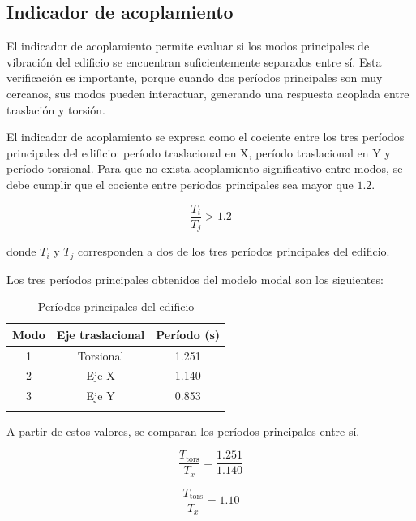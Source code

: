 \subsection{Indicador de acoplamiento}

El indicador de acoplamiento permite evaluar si los modos principales de vibración del edificio se encuentran suficientemente separados entre sí. Esta verificación es importante, porque cuando dos períodos principales son muy cercanos, sus modos pueden interactuar, generando una respuesta acoplada entre traslación y torsión.

El indicador de acoplamiento se expresa como el cociente entre los tres períodos principales del edificio: período traslacional en X, período traslacional en Y y período torsional. Para que no exista acoplamiento significativo entre modos, se debe cumplir que el cociente entre períodos principales sea mayor que $1.2$.

\begin{equation}
\frac{T_i}{T_j} > 1.2
\end{equation}

donde $T_i$ y $T_j$ corresponden a dos de los tres períodos principales del edificio. 

Los tres períodos principales obtenidos del modelo modal son los siguientes:

\begin{table}[H]
    \centering
    \caption{Períodos principales del edificio}
    \begin{tabular}{ccc}
    \hline
    Modo & Eje traslacional & Período (s) \\
    \hline
    1 & Torsional & 1.251 \\
    2 & Eje X & 1.140 \\
    3 & Eje Y & 0.853 \\
    \hline
        \vspace{0.001cm}
    \end{tabular}
    
\end{table}

A partir de estos valores, se comparan los períodos principales entre sí.

\begin{equation}
\frac{T_{\text{tors}}}{T_x} = \frac{1.251}{1.140}
\end{equation}

\begin{equation}
\frac{T_{\text{tors}}}{T_x} = 1.10
\end{equation}

